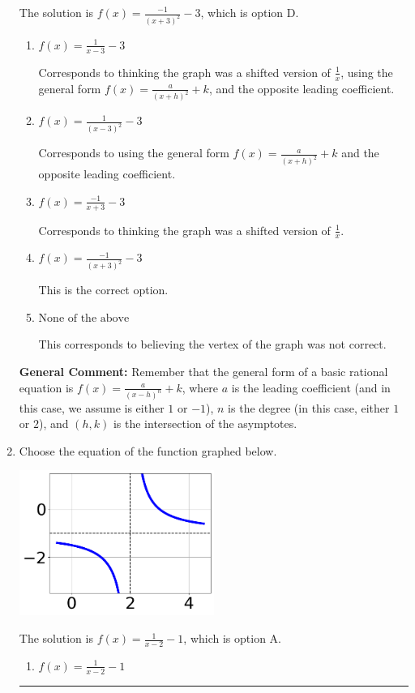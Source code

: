\documentclass{extbook}[14pt]
\newcommand{\litem}[1]{\item #1

\rule{\textwidth}{0.4pt}}
\begin{document}
\begin{enumerate}
{The solution is \( f(x) = \frac{-1}{(x + 3)^2} - 3 \), which is option D.\begin{enumerate}[label=\Alph*.]
\item \( f(x) = \frac{1}{x - 3} - 3 \)

Corresponds to thinking the graph was a shifted version of $\frac{1}{x}$, using the general form $f(x) = \frac{a}{(x+h)^2}+k$, and the opposite leading coefficient.
\item \( f(x) = \frac{1}{(x - 3)^2} - 3 \)

Corresponds to using the general form $f(x) = \frac{a}{(x+h)^2}+k$ and the opposite leading coefficient.
\item \( f(x) = \frac{-1}{x + 3} - 3 \)

Corresponds to thinking the graph was a shifted version of $\frac{1}{x}$.
\item \( f(x) = \frac{-1}{(x + 3)^2} - 3 \)

This is the correct option.
\item \( \text{None of the above} \)

This corresponds to believing the vertex of the graph was not correct.
\end{enumerate}

\textbf{General Comment:} Remember that the general form of a basic rational equation is $ f(x) = \frac{a}{(x-h)^n} + k$, where $a$ is the leading coefficient (and in this case, we assume is either $1$ or $-1$), $n$ is the degree (in this case, either $1$ or $2$), and $(h, k)$ is the intersection of the asymptotes.
}
\litem{
Choose the equation of the function graphed below.

\begin{center}
    \includegraphics[width=0.5\textwidth]{../Figures/rationalGraphToEquationCopyA.png}
\end{center}


The solution is \( f(x) = \frac{1}{x - 2} - 1 \), which is option A.\begin{enumerate}[label=\Alph*.]
\item \( f(x) = \frac{1}{x - 2} - 1 \)


\end{enumerate}}
\end{enumerate}
\end{document}
